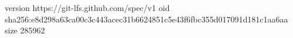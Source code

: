 version https://git-lfs.github.com/spec/v1
oid sha256:e8d298a63ca00c3c443acec31b6624851c5e43f6fbc355d017091d181c1aa6aa
size 285962
